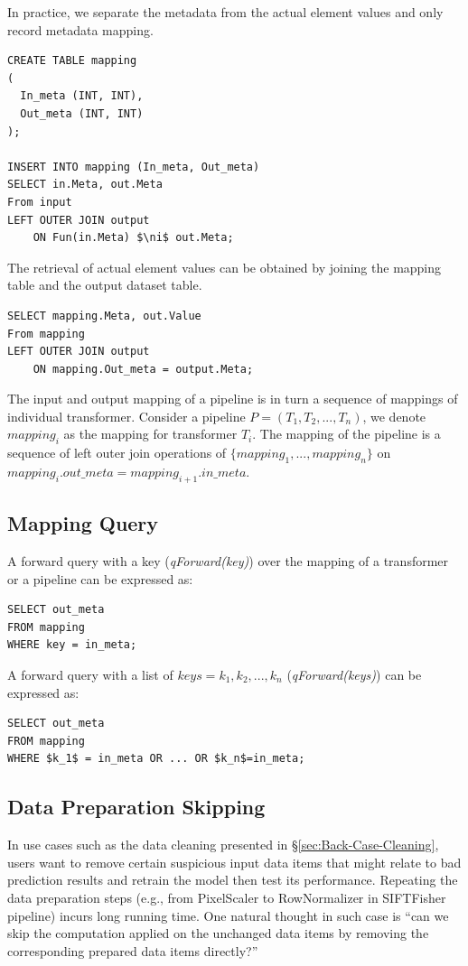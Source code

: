 \documentclass{sig-alternate}
\begin{document}
In practice, we separate the metadata from the actual element values and only record metadata mapping.
\begin{lstlisting}
CREATE TABLE mapping
(
  In_meta (INT, INT),
  Out_meta (INT, INT)
);

INSERT INTO mapping (In_meta, Out_meta)
SELECT in.Meta, out.Meta
From input
LEFT OUTER JOIN output 
    ON Fun(in.Meta) $\ni$ out.Meta;
\end{lstlisting}
The retrieval of actual element values can be obtained by joining the mapping table and the output dataset table.
\begin{lstlisting}
SELECT mapping.Meta, out.Value
From mapping
LEFT OUTER JOIN output 
    ON mapping.Out_meta = output.Meta;
\end{lstlisting}

The input and output mapping of a pipeline is in turn a sequence of mappings of individual transformer.
Consider a pipeline $P=(T_1, T_2, ..., T_n)$, we denote $mapping_i$ as the mapping for transformer $T_i$.
The mapping of the pipeline is a sequence of left outer join operations of $\{mapping_1, ..., mapping_n\}$ on 
$mapping_i.out\_meta = mapping_{i+1}.in\_meta$.

\subsection{Mapping Query}
A forward query with a key  ({\it qForward(key)}) over the mapping of a transformer or a pipeline can be expressed as:
\begin{lstlisting}
SELECT out_meta
FROM mapping
WHERE key = in_meta;
\end{lstlisting}

A forward query with a list of $keys={k_1, k_2, ..., k_n}$ ({\it qForward(keys)}) can be expressed as:
\begin{lstlisting}
SELECT out_meta
FROM mapping
WHERE $k_1$ = in_meta OR ... OR $k_n$=in_meta;
\end{lstlisting}

\subsection{Data Preparation Skipping}
\label{sec:formal-skipping}
In use cases such as the data cleaning presented in \S\ref{sec:Back-Case-Cleaning}, users want
to remove certain suspicious input data items that might relate to bad prediction results and retrain the model then
test its performance. 
Repeating the data preparation steps (e.g., from PixelScaler to RowNormalizer in SIFTFisher pipeline) incurs
long running time.
One natural thought in such case is ``can we skip the computation applied on the unchanged data items by removing
the corresponding prepared data items directly?''
\end{document}
